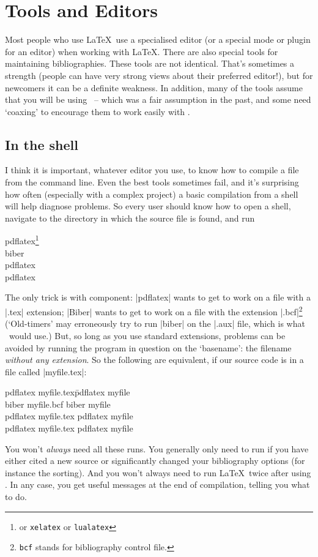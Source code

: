\chapter{Tools and Editors}\label{ch:tools}

Most people who use \LaTeX\ use a specialised editor (or a special
mode or plugin for an editor) when working with \LaTeX. There are also
special tools for maintaining bibliographies. These tools are not
identical. That's sometimes a strength (people can have very strong
views about their preferred editor!), but for newcomers it can be a
definite weakness. In addition, many of the tools assume that you will
be using \bibtex\ -- which was a fair assumption in the past, and some
need `coaxing' to encourage them to work easily with \biblatex.

\section{In the shell}

I think it is important, whatever editor you use, to know how to
compile a file from the command line. Even the best tools sometimes
fail, and it's surprising how often (especially with a complex
project) a basic compilation from a shell will help diagnose
problems. So every user should know how to open a shell, navigate to
the directory in which the source file is found, and run
\begin{pseudoverb}
pdflatex\footnote{or \texttt{xelatex} or \texttt{lualatex}} \\
biber \\
pdflatex \\
pdflatex 
\end{pseudoverb}
The only trick is with  component: |pdflatex| wants to
get to work on a file with a |.tex| extension; |Biber| wants to get to
work on a file with the extension |.bcf|\footnote{\texttt{bcf} stands
  for bibliography control file.} (`Old-timers' may erroneously try to
run |biber| on the |.aux| file, which is what \bibtex\ would use.)
But, so long as you use standard extensions, problems can be
avoided by running the program in question on the `basename': the
filename \emph{without any extension}. So the following are
equivalent, if our source code is in a file called |myfile.tex|:
\begin{pseudoverb}
\begin{tabbing}
pdflatex myfile.tex\qquad   \= pdflatex myfile\\
biber myfile.bcf \> biber myfile\\
pdflatex myfile.tex \> pdflatex myfile\\
pdflatex myfile.tex \> pdflatex myfile
\end{tabbing}
\end{pseudoverb}
You won't \emph{always} need all these runs. You generally only need
to run  if you have either cited a new source or
significantly changed your bibliography options (for instance the
sorting). And you won't always need to run \LaTeX\ twice after using
. In any case, you get useful messages at the end of
compilation, telling you what to do.


